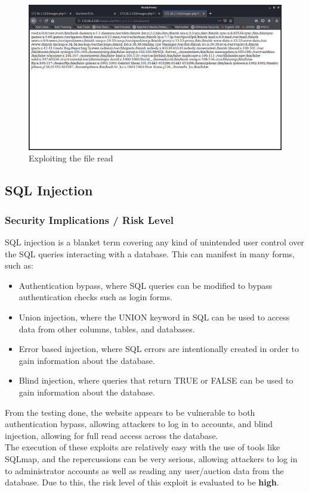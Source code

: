 \documentclass{report}
\begin{document}
\begin{figure}[!htb]
	\centering
	\includegraphics[scale=0.4]{img/pathtraversal3.png}
	\caption{Exploiting the file read}
\end{figure}
\pagebreak



\subsection{SQL Injection}
\subsubsection{Security Implications / Risk Level}
SQL injection is a blanket term covering any kind of unintended user control over the SQL queries interacting with a database. This can manifest in many forms, such as:
\begin{itemize}
	\item Authentication bypass, where SQL queries can be modified to bypass authentication checks such as login forms.
	\item Union injection, where the UNION keyword in SQL can be used to access data from other columns, tables, and databases.
	\item Error based injection, where SQL errors are intentionally created in order to gain information about the database.
	\item Blind injection, where queries that return TRUE or FALSE can be used to gain information about the database.
\end{itemize}
From the testing done, the website appears to be vulnerable to both authentication bypass, allowing attackers to log in to accounts, and blind injection, allowing for full read access across the database.\\
The execution of these exploits are relatively easy with the use of tools like SQLmap, and the repercussions can be very serious, allowing attackers to log in to administrator accounts as well as reading any user/auction data from the database. Due to this, the risk level of this exploit is evaluated to be \textbf{high}.
\end{document}
